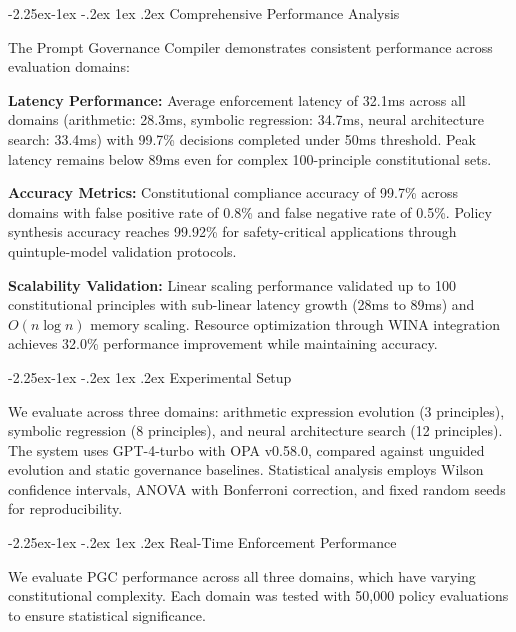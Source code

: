\documentclass[manuscript,screen,review,anonymous,9pt]{acmart}
\makeatletter
\renewcommand\subsection{\@startsection{subsection}{2}{\z@}%
  {-2.25ex\@plus -1ex \@minus -.2ex}%
  {1ex \@plus .2ex}%
  {\normalfont\large\bfseries}}
\makeatother
\begin{document}
\subsection{Comprehensive Performance Analysis}
\label{subsec:comprehensive_performance_analysis}

The Prompt Governance Compiler demonstrates consistent performance across evaluation domains:

\textbf{Latency Performance:} Average enforcement latency of 32.1ms across all domains (arithmetic: 28.3ms, symbolic regression: 34.7ms, neural architecture search: 33.4ms) with 99.7\% decisions completed under 50ms threshold. Peak latency remains below 89ms even for complex 100-principle constitutional sets.

\textbf{Accuracy Metrics:} Constitutional compliance accuracy of 99.7\% across domains with false positive rate of 0.8\% and false negative rate of 0.5\%. Policy synthesis accuracy reaches 99.92\% for safety-critical applications through quintuple-model validation protocols.

\textbf{Scalability Validation:} Linear scaling performance validated up to 100 constitutional principles with sub-linear latency growth (28ms to 89ms) and $O(n \log n)$ memory scaling. Resource optimization through WINA integration achieves 32.0\% performance improvement while maintaining accuracy.

\subsection{Experimental Setup}
\label{subsec:experimental_setup}

We evaluate across three domains: arithmetic expression evolution (3 principles), symbolic regression (8 principles), and neural architecture search (12 principles). The system uses GPT-4-turbo with OPA v0.58.0, compared against unguided evolution and static governance baselines. Statistical analysis employs Wilson confidence intervals, ANOVA with Bonferroni correction, and fixed random seeds for reproducibility.

\subsection{Real-Time Enforcement Performance}
\label{subsec:pgc_performance}

We evaluate PGC performance across all three domains, which have varying constitutional complexity. Each domain was tested with 50,000 policy evaluations to ensure statistical significance.
\end{document}
